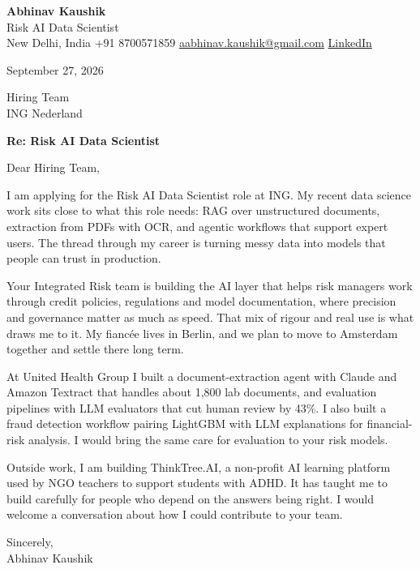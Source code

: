 \documentclass[11pt,a4paper]{article}
\begin{document}
{\Large\bfseries Abhinav Kaushik}\\
Risk AI Data Scientist\\
New Delhi, India \textbar{} +91 8700571859 \textbar{} \href{mailto:aabhinav.kaushik@gmail.com}{aabhinav.kaushik@gmail.com} \textbar{} \href{https://www.linkedin.com/in/abhinav-kaushik10/}{LinkedIn}  

September 27, 2026

Hiring Team\\
ING Nederland

\textbf{Re: Risk AI Data Scientist}

Dear Hiring Team,

I am applying for the Risk AI Data Scientist role at ING. My recent data science work sits close to what this role needs: RAG over unstructured documents, extraction from PDFs with OCR, and agentic workflows that support expert users. The thread through my career is turning messy data into models that people can trust in production.

Your Integrated Risk team is building the AI layer that helps risk managers work through credit policies, regulations and model documentation, where precision and governance matter as much as speed. That mix of rigour and real use is what draws me to it. My fiancée lives in Berlin, and we plan to move to Amsterdam together and settle there long term.

At United Health Group I built a document-extraction agent with Claude and Amazon Textract that handles about 1,800 lab documents, and evaluation pipelines with LLM evaluators that cut human review by 43\%. I also built a fraud detection workflow pairing LightGBM with LLM explanations for financial-risk analysis. I would bring the same care for evaluation to your risk models.

Outside work, I am building ThinkTree.AI, a non-profit AI learning platform used by NGO teachers to support students with ADHD. It has taught me to build carefully for people who depend on the answers being right. I would welcome a conversation about how I could contribute to your team.

Sincerely,\\[4pt]
Abhinav Kaushik
\end{document}
